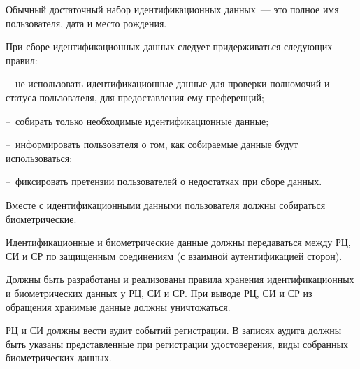 \begin{note}
Обычный достаточный набор идентификационных данных~--- это 
полное имя пользователя, дата и место рождения.
\end{note}

\begin{note}
При сборе идентификационных данных следует придерживаться следующих правил: 

--~не использовать идентификационные данные для проверки полномочий 
и статуса пользователя, для предоставления ему преференций;

--~собирать только необходимые идентификационные данные;

%

--~информировать пользователя о том, как собираемые данные будут использоваться;

--~фиксировать претензии пользователей о недостатках при сборе данных.
\end{note}


Вместе с идентификационными данными пользователя должны собираться  
биометрические. 

Идентификационные и биометрические данные должны передаваться между
РЦ, СИ и СР по защищенным соединениям (с взаимной аутентификацией сторон).

Должны быть разработаны и реализованы правила хранения идентификационных 
и биометрических данных у РЦ, СИ и СР. 
%
%
При выводе РЦ, СИ и СР из обращения хранимые данные должны уничтожаться.


\label{R.UR.Audit}
РЦ и СИ должны вести аудит событий регистрации. В записях аудита 
должны быть указаны представленные при регистрации удостоверения,
виды собранных биометрических данных.


